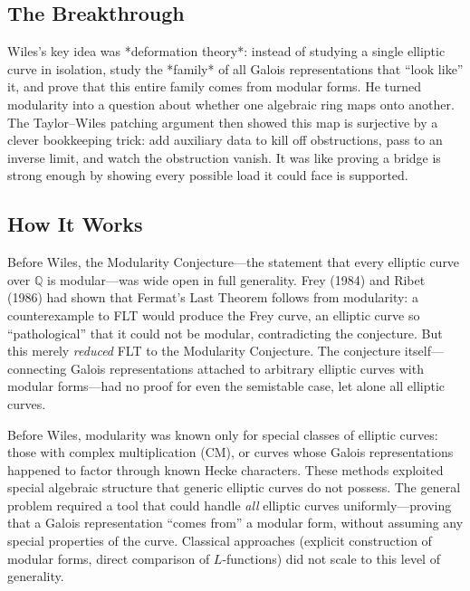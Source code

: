 \subsection{The Breakthrough}
Wiles's key idea was *deformation theory*: instead of studying a single elliptic curve in isolation, study the *family* of all Galois representations that ``look like'' it, and prove that this entire family comes from modular forms. He turned modularity into a question about whether one algebraic ring maps onto another. The Taylor--Wiles patching argument then showed this map is surjective by a clever bookkeeping trick: add auxiliary data to kill off obstructions, pass to an inverse limit, and watch the obstruction vanish. It was like proving a bridge is strong enough by showing every possible load it could face is supported.

\subsection{How It Works}

Before Wiles, the Modularity Conjecture---the statement that every elliptic curve over $\mathbb{Q}$ is modular---was wide open in full generality. Frey (1984) and Ribet (1986) had shown that Fermat's Last Theorem follows from modularity: a counterexample to FLT would produce the Frey curve, an elliptic curve so ``pathological'' that it could not be modular, contradicting the conjecture. But this merely \emph{reduced} FLT to the Modularity Conjecture. The conjecture itself---connecting Galois representations attached to arbitrary elliptic curves with modular forms---had no proof for even the semistable case, let alone all elliptic curves.

Before Wiles, modularity was known only for special classes of elliptic curves: those with complex multiplication (CM), or curves whose Galois representations happened to factor through known Hecke characters. These methods exploited special algebraic structure that generic elliptic curves do not possess. The general problem required a tool that could handle \emph{all} elliptic curves uniformly---proving that a Galois representation ``comes from'' a modular form, without assuming any special properties of the curve. Classical approaches (explicit construction of modular forms, direct comparison of $L$-functions) did not scale to this level of generality.

